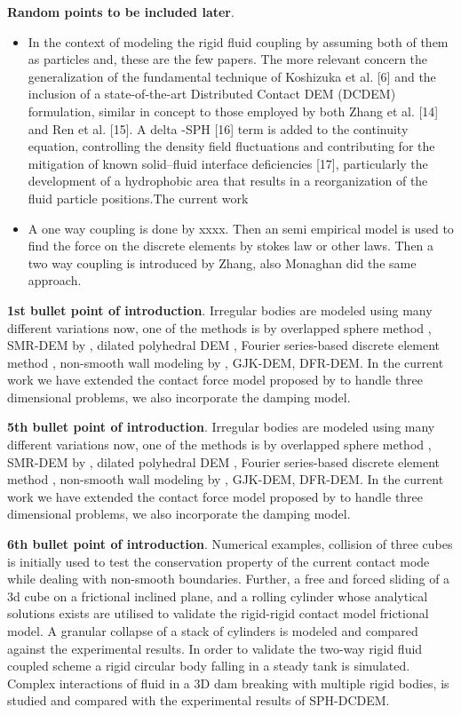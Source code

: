 \documentclass[preprint,12pt]{elsarticle}
\begin{document}
\textbf{Random points to be included later}.
\begin{itemize}
\item In the context of modeling the rigid fluid coupling by assuming both of
  them as particles and, these are the few papers. The more relevant concern
  the generalization of the fundamental technique of Koshizuka et al. [6] and
  the inclusion of a state-of-the-art Distributed Contact DEM (DCDEM)
  formulation, similar in concept to those employed by both Zhang et al. [14]
  and Ren et al. [15]. A delta -SPH [16] term is added to the continuity equation,
  controlling the density field fluctuations and contributing for the
  mitigation of known solid–fluid interface deficiencies [17], particularly
  the development of a hydrophobic area that results in a reorganization of
  the fluid particle positions.The current work
\item A one way coupling is done by xxxx. Then an semi empirical model is used
  to find the force on the discrete elements by stokes law or other laws. Then
  a two way coupling is introduced by Zhang, also Monaghan did the same
  approach.
\end{itemize}


\textbf{1st bullet point of introduction}. Irregular bodies are modeled using
many different variations now, one of the methods is by overlapped sphere
method \cite{das2007modeling}, SMR-DEM by \citet{zhan2021surface}, dilated
polyhedral DEM \citet{liu2020new}, Fourier series-based discrete element
method \citet{lai2020fourier}, non-smooth wall modeling by
\citet{amaro2019improvement}, GJK-DEM, DFR-DEM. In the current work we have
extended the contact force model proposed by \citet{mohseni2021particle} to
handle three dimensional problems, we also incorporate the damping model.


\textbf{5th bullet point of introduction}. Irregular bodies are modeled using
many different variations now, one of the methods is by overlapped sphere
method \cite{das2007modeling}, SMR-DEM by \citet{zhan2021surface}, dilated
polyhedral DEM \citet{liu2020new}, Fourier series-based discrete element
method \citet{lai2020fourier}, non-smooth wall modeling by
\citet{amaro2019improvement}, GJK-DEM, DFR-DEM. In the current work we have
extended the contact force model proposed by \citet{mohseni2021particle} to
handle three dimensional problems, we also incorporate the damping model.


\textbf{6th bullet point of introduction}. Numerical examples, collision of
three cubes is initially used to test the conservation property of the current
contact mode while dealing with non-smooth boundaries. Further, a free and
forced sliding of a 3d cube on a frictional inclined plane, and a rolling
cylinder whose analytical solutions exists are utilised to validate the
rigid-rigid contact model frictional model. A granular collapse of a stack of
cylinders is modeled and compared against the experimental results. In order
to validate the two-way rigid fluid coupled scheme a rigid circular body
falling in a steady tank is simulated. Complex interactions of fluid in a 3D
dam breaking with multiple rigid bodies, is studied and compared with the
experimental results of SPH-DCDEM.
\end{document}
